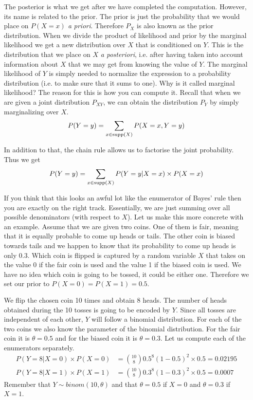 The posterior is what we get after we have completed the computation. However, its name is related to the prior.
The prior is just the probability that we would place on $ P(X=x) $ \textit{a priori}. Therefore $ P_{X} $
is also known as the prior distribution. When we divide the product of likelihood and prior by the 
marginal likelihood we get a new distribution
over $ X $ that is conditioned on $ Y $. This is the distribution that we place on $ X $ \textit{a posteriori}, i.e.
after having taken into account information about $ X $ that we may get from knowing the value of $ Y $. The marginal
likelihood of $ Y $ is simply needed to normalize the expression to a probability distribution (i.e. to make sure that
it sums to one). Why is it called marginal likelihood? The reason for this is how you can compute it. Recall that when
we are given a joint distribution $ P_{XY} $, we can obtain the distribution
$ P_{Y} $ by simply marginalizing over $ X $.
\begin{equation}
P(Y=y) = \sum_{x \in \operatorname{supp}(X)}P(X=x, Y=y)
\end{equation}

In addition to that, the chain rule allows us to factorise the joint probability. Thus we get
\begin{equation}
P(Y=y) = \sum_{x \in \operatorname{supp}(X)} P(Y=y|X=x) \times P(X=x)
\end{equation}

If you think that this looks an awful lot like the enumerator of Bayes' rule then you are exactly on the right track.
Essentially, we are just summing over all possible denominators (with respect to $ X $). Let us make this more
concrete with an example. Assume that we are given two coins. One of them is fair, meaning that it is equally probable
to come up heads or tails. The other coin is biased towards tails and we happen to know that its probability to come up
heads is only $ 0.3 $. Which coin is flipped is captured by a random variable $ X $ that takes on the value 0 if the
fair coin is used and the value 1 if the biased coin is used. We have no idea which coin is going to be tossed, it could
be either one. Therefore we set our prior to $ P(X=0) = P(X=1) = 0.5 $.

We flip the chosen coin 10 times and obtain 8 heads. The number of heads obtained during the 10 tosses is going
to be encoded by $ Y $. Since all tosses are independent of each other, $ Y $ will
follow a binomial distribution. For each of the two coins we also know the parameter of the binomial distribution.
For the fair coin it is $ \theta = 0.5 $ and for the biased coin it is $ \theta = 0.3 $. Let us compute each of the
enumerators separately.
\begin{align}
P(Y=8|X=0) \times P(X=0) &= \binom{10}{8} 0.5^8 (1-0.5)^2 \times 0.5 = 0.02195 \label{bayes1}\\
P(Y=8|X=1) \times P(X=1) &= \binom{10}{8} 0.3^8 (1-0.3)^2 \times 0.5 = 0.0007 \label{bayes2}
\end{align}
Remember that $ Y \sim binom(10,\theta) $ and that $ \theta=0.5 $ if $ X=0 $ and $ \theta=0.3 $ if $ X=1 $. 

